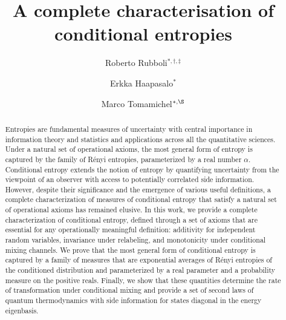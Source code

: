 \documentclass[aps,pra,11pt,onecolumn,nofootinbib,tightenlines]{revtex4-2}
\theoremstyle{definition}
\begin{document}
\title{\Large A complete characterisation of conditional entropies}

\begin{abstract}
Entropies are fundamental measures of uncertainty with central importance in information theory and statistics and applications across all the quantitative sciences. Under a natural set of operational axioms, the most general form of entropy is captured by the family of Rényi entropies, parameterized by a real number $\alpha$. 
%
Conditional entropy extends the notion of entropy by quantifying uncertainty from the viewpoint of an observer with access to potentially correlated side information. However, despite their significance and the emergence of various useful definitions, a complete characterization of measures of conditional entropy that satisfy a natural set of operational axioms has remained elusive.
%
In this work, we provide a complete characterization of conditional entropy, defined through a set of axioms that are essential for any operationally meaningful definition: additivity for independent random variables, invariance under relabeling, and monotonicity under conditional mixing channels. 
%
We prove that the most general form of conditional entropy is captured by a family of measures that are exponential averages of Rényi entropies of the conditioned distribution and parameterized by a real parameter and a probability measure on the positive reals. Finally, we show that these quantities determine the rate of transformation under conditional mixing and provide a set of second laws of quantum thermodynamics with side information for states diagonal in the energy eigenbasis.


\end{abstract}



\author{Roberto Rubboli$^{*,\dagger,\ddagger}$}
\author{Erkka Haapasalo$^{*}$}
\author{Marco Tomamichel$^{*,\S}$}

\maketitle


\begingroup
\renewcommand{\thefootnote}{\fnsymbol{footnote}}

{} %
{}                         %
\end{document}
